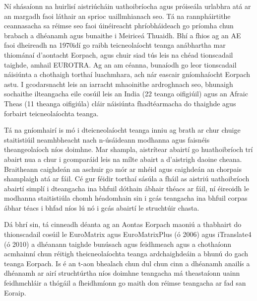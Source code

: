 \begin{multicols}{2}

Ní shásaíonn na huirlisí aistriúcháin uathoibríocha agus próiseála urlabhra atá ar an margadh faoi láthair an sprioc uaillmhianach seo. Tá na rannpháirtithe ceannasacha sa réimse seo faoi úinéireacht phríobháideach go príomha chun brabach a dhéanamh agus bunaithe i Meiriceá Thuaidh. Bhí a fhios ag an AE faoi dheireadh na 1970idí go raibh teicneolaíocht teanga an\-ábhartha mar thiománaí d’aontacht Eorpach, agus chuir siad tús leis na chéad tionscadail taighde, amhail EUROTRA. Ag an am céanna, bunaíodh go leor tionscadail náisiúnta a chothaigh torthaí luachmhara, ach nár eascair gníomhaíocht Eorpach astu. I gcodarsnacht leis an iarracht mhaoinithe ardroghnach seo, bhunaigh sochaithe ilteangacha eile cosúil leis an India (22 teanga oifigiúil) agus an Afraic Theas (11 theanga oifigiúla) cláir náisiúnta fhadtéarmacha do thaighde agus forbairt teicneolaíochta teanga. 

Tá na gníomhairí is mó i dteicneolaíocht teanga inniu ag brath ar chur chuige staitistiúil neamhbheacht nach n-úsáideann modhanna agus faisnéis theangeolaíoch níos doimhne. Mar shampla, aistrítear abairtí go huathoibríoch trí abairt nua a chur i gcomparáid leis na mílte abairt a d’aistrigh daoine cheana. Braitheann caighdeán an aschuir go mór ar mhéid agus caighdeán an chorpais shamplaigh atá ar fáil. Cé gur féidir torthaí sásúla a fháil as aistriú uathoibríoch abairtí simplí i dteangacha ina bhfuil dóthain ábhair théacs ar fáil, ní éireoidh le modhanna staitistiúla chomh héadomhain sin i gcás teangacha ina bhfuil corpas ábhar téacs i bhfad níos lú nó i gcás abairtí le struchtúir chasta.


Dá bhrí sin, tá cinneadh déanta ag an Aontas Eorpach maoniú a thabhairt do thionscadail cosúil le EuroMatrix agus EuroMatrixPlus (ó 2006) agus iTranslate4 (ó 2010) a dhéanann taighde bunúsach agus feidhmeach agus a chothaíonn acmhainní chun réitigh theicneolaíochta teanga ardchaighdeáin a bhunú do gach teanga Eorpach. Is é an t-aon bhealach chun dul chun cinn a dhéanamh anailís a dhéanamh ar airí struchtúrtha níos doimhne teangacha má theastaíonn uainn feidhmchláir a thógáil a fheidhmíonn go maith don réimse teangacha ar fad san Eoraip.
\columnbreak


\end{multicols}

